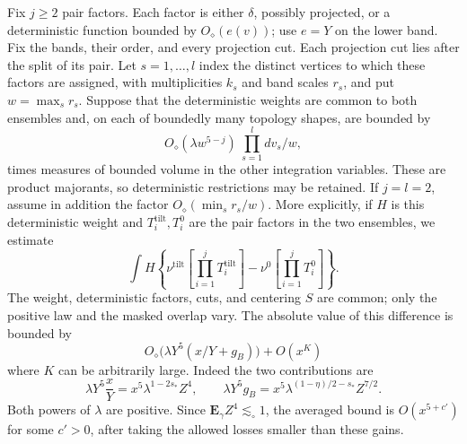 \begin{lemma}\label{exp:lem-centered-count}
Fix \(j\ge2\) pair factors. Each factor is either \(\delta\), possibly
projected, or a deterministic function bounded by
\(O_\diamond(e(v))\); use \(e=Y\) on the lower band. Fix the bands, their
order, and every projection cut. Each projection cut lies after the
split of its pair. Let \(s=1,\ldots,l\) index the distinct vertices to
which these factors are assigned, with multiplicities \(k_s\) and band
scales \(r_s\), and put \(w=\max_s r_s\). Suppose that the deterministic
weights are common to both ensembles and, on each of boundedly many
topology shapes, are bounded by
\[
 O_\diamond(\lambda w^{5-j})\ \prod_{s=1}^l dv_s/w,                    \tag{E2}\label{eq:E1}
\]
times measures of bounded volume in the other integration variables.
These are product majorants, so deterministic restrictions may be
retained. If \(j=l=2\), assume in addition the factor
\(O_\diamond(\min_s r_s/w)\). More explicitly, if \(H\) is this
deterministic weight and \(T_i^{\mathrm{tilt}},T_i^0\) are the pair
factors in the two ensembles, we estimate
\[
 \int H\left\{\nu^{\mathrm{tilt}}
       \left[\prod_{i=1}^jT_i^{\mathrm{tilt}}\right]
       -\nu^0\left[\prod_{i=1}^jT_i^0\right]\right\}.
\]
The weight, deterministic factors, cuts, and centering \(S\) are common;
only the positive law and the masked overlap vary. The absolute value
of this difference is bounded by
\[
 O_\diamond\big(\lambda Y^5(x/Y+g_B)\big)+O(x^K)                       \tag{E3}\label{eq:E2}
\]
where \(K\) can be arbitrarily large. Indeed the two contributions are
\[
 \lambda Y^5\frac{x}{Y}=x^5\lambda^{1-2s_*}Z^4,
 \qquad
 \lambda Y^5g_B=x^5\lambda^{(1-\eta)/2-s_*}Z^{7/2}.
\]
Both powers of \(\lambda\) are positive. Since
\(\mathbf E_\gamma Z^4\lesssim_\circ1\), the averaged bound is
\(O(x^{5+c'})\) for some \(c'>0\), after taking the allowed losses smaller
than these gains.
\end{lemma}


